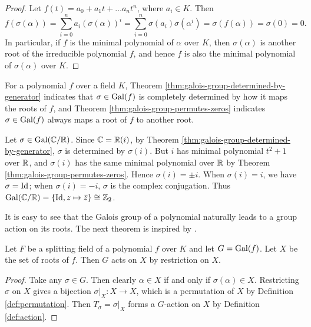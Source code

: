 \begin{proof}
	Let $f(t) = a_0 + a_1 t + \dots a_n t^n$, where $a_i \in K$. Then $$f(\sigma(\alpha)) = \sum_{i=0}^n a_i \left( \sigma (\alpha) \right)^i
	= \sum_{i=0}^n \sigma(a_i)  \sigma (\alpha ^ i) 
	= \sigma(f(\alpha)) = \sigma(0) = 0. $$
	In particular, if $f$ is the minimal polynomial of $\alpha$ over $K$, then $\sigma(\alpha)$ is another root of the irreducible polynomial $f$, and hence $f$ is also the minimal polynomial of $\sigma(\alpha)$ over $K$. 
\end{proof}



For a polynomial $f$ over a field $K$, Theorem \ref{thm:galois-group-determined-by-generator} indicates that $\sigma \in \operatorname{Gal}(f)$ is completely determined by how it maps the roots of $f$, and Theorem \ref{thm:galois-group-permutes-zeros} indicates $\sigma \in \operatorname{Gal}(f)$ always maps a root of $f$ to another root.

\begin{example}
	Let $\sigma \in \operatorname{Gal}(\mathbb C/\mathbb R)$. Since $\mathbb C= \mathbb R(i)$, by Theorem \ref{thm:galois-group-determined-by-generator}, $\sigma$ is determined by $\sigma(i)$. But $i$ has minimal polynomial $t^2 + 1$ over $\mathbb R$, and $\sigma(i)$ has the same minimal polynomial over $\mathbb R$ by Theorem \ref{thm:galois-group-permutes-zeros}. Hence $\sigma(i) = \pm i$. When $\sigma(i) = i$, we have $\sigma = \operatorname{Id}$; when $\sigma(i) = -i$, $\sigma$ is the complex conjugation. Thus $\operatorname{Gal}(\mathbb C / \mathbb R) = \{\operatorname{Id}, z \mapsto \bar z \} \cong \mathbb Z_2$. 
\end{example}

It is easy to see that the Galois group of a polynomial naturally leads to a group action on its roots. The next theorem is inspired by \cite{visual-algebra}. 


\begin{theorem} \label{thm:galois-group-acts-on-zeros}
	Let $F$ be a splitting field of a polynomial $f$ over $K$ and let $G = \operatorname{Gal}(f)$. Let $X$ be the set of roots of $f$. Then $G$ acts on $X$ by restriction on $X$. 
\end{theorem}

\begin{proof}
	Take any $\sigma \in G$. Then clearly $\alpha \in X$ if and only if $\sigma(\alpha) \in X$. Restricting $\sigma$ on $X$ gives a bijection $\sigma | _X : X \to X$, which is a permutation of $X$ by Definition \ref{def:permutation}. Then $T_\sigma  = \sigma | _X$ forms a $G$-action on $X$ by Definition \ref{def:action}.  
\end{proof}



